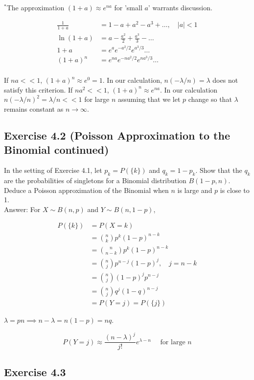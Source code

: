 \documentclass{article}
\begin{document}
$^*$The approximation $(1+a) \approx e^{na}$ for 'small $a$' warrants discussion.

\begin{align*}
\frac{1}{1+a} &= 1 - a + a^2 - a^3 + \dots, \quad |a| < 1\\
\ln (1+a) &= a - \frac{a^2}{2} + \frac{a^3}{3} - \dots \\
1+a &= e^ae^{-a^2/2}e^{a^3/3}\dots \\
(1+a)^n &= e^{na}e^{-na^2/2}e^{na^3/3}\dots \\
\end{align*}

If $na << 1$, $(1+a)^n \approx e^0 = 1$. In our calculation, $n(-\lambda / n) = \lambda$ does not satisfy this criterion. If $na^2 <<1$, $(1+a)^n \approx e^{na}$. In our calculation $n(-\lambda / n)^2 = \lambda / n << 1$ for large $n$ assuming that we let $p$ change so that $\lambda$ remains constant as $n \rightarrow \infty$. 

\subsection*{Exercise 4.2 (Poisson Approximation to the Binomial continued)}

In the setting of Exercise 4.1, let $p_k = P(\{k\})$ and $q_k = 1 - p_k$. Show that the $q_k$ are the
probabilities of singletons for a Binomial distribution $B(1 - p, n)$. Deduce a Poisson approximation of the Binomial when $n$ is large and $p$ is close to 1. \\

Answer: For $X \sim B(n,p)$ and $Y \sim B(n,1-p)$,

\begin{align*}
P(\{k\}) &= P(X = k)\\
&= \binom{n}{k} p^k(1-p)^{n-k} \\
&= \binom{n}{n-k} p^k(1-p)^{n-k} \\
&= \binom{n}{j} p^{n-j}(1-p)^{j}, \quad j = n-k \\
&= \binom{n}{j} (1-p)^{j}p^{n-j} \\
&= \binom{n}{j} q^j(1-q)^{n-j} \\
&= P(Y = j) = P(\{j\})
\end{align*}

$\lambda = pn \implies n-\lambda = n(1-p) = nq$. 

$$
P(Y = j) \approx \frac{(n-\lambda)^j}{j!}e^{\lambda - n} \quad \text{ for large } n
$$

\subsection*{Exercise 4.3}
\end{document}
